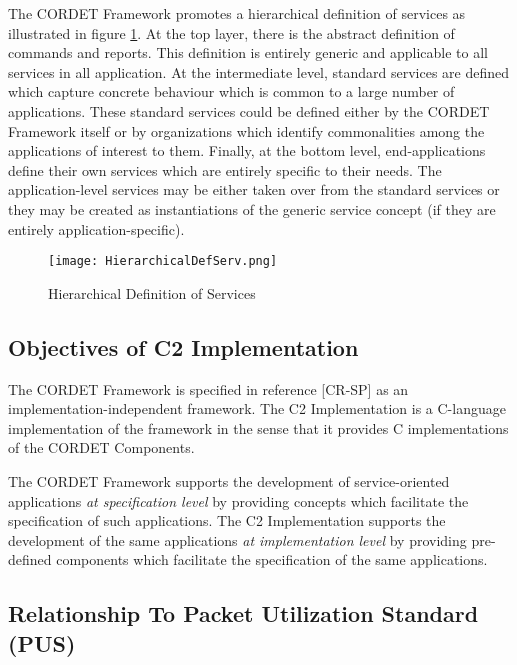 \documentclass{pnp_article}
\begin{document}
The CORDET Framework promotes a hierarchical definition of services as illustrated in figure \ref{fig:HierarchicalDefServ}. 
At the top layer, there is the abstract definition of commands and reports. 
This definition is entirely generic and applicable to all services in all application. 
At the intermediate level, standard services are defined which capture concrete behaviour which is common to a large number of applications. 
These standard services could be defined either by the CORDET Framework itself or by organizations which identify commonalities among the applications of interest to them. 
Finally, at the bottom level, end-applications define their own services which are entirely specific to their needs. 
The application-level services may be either taken over from the standard services or they may be created as instantiations of the generic service concept (if they are entirely application-specific).

\begin{figure}[ht]
 \centering
 \texttt{[image: HierarchicalDefServ.png]}
 \caption{Hierarchical Definition of Services}
 \label{fig:HierarchicalDefServ}
\end{figure}

\subsection{Objectives of C2 Implementation}\label{sec:ObjectivesC2Impl} 

The CORDET Framework is specified in reference [CR-SP] as an implementation-independent framework.
The C2 Implementation is a C-language implementation of the framework in the sense that it provides C implementations of the CORDET Components.

The CORDET Framework supports the development of service-oriented applications \textit{at specification level} by providing concepts which facilitate the specification of such applications.
The C2 Implementation supports the development of the same applications \textit{at implementation level} by providing pre-defined components which facilitate the specification of the same applications.

\subsection{Relationship To Packet Utilization Standard (PUS)}\label{sec:RelationshipToPUS}

\end{document}
